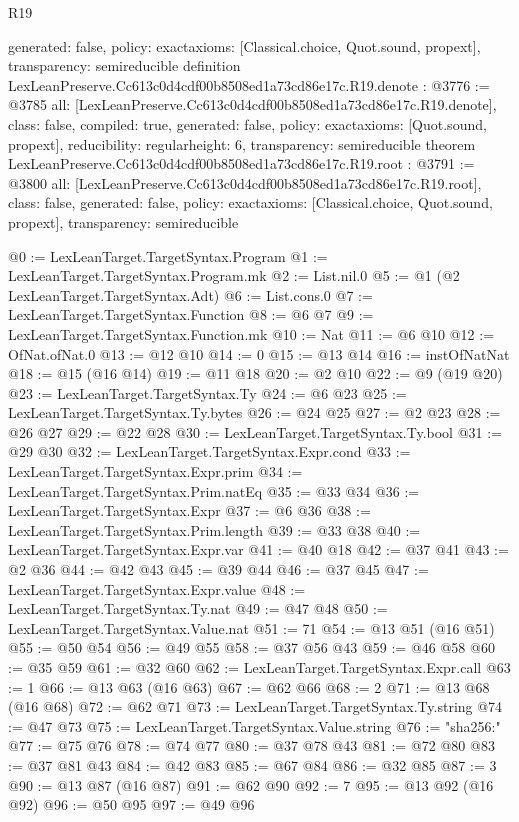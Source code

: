 \begin{lexlean}{R19}
\begin{coremodule}
{  generated: false,
  policy: exact{axioms: [Classical.choice, Quot.sound, propext]},
  transparency: semireducible
}
definition LexLeanPreserve.Cc613c0d4cdf00b8508ed1a73cd86e17c.R19.denote : @3776 := @3785 {
  all: [LexLeanPreserve.Cc613c0d4cdf00b8508ed1a73cd86e17c.R19.denote],
  class: false,
  compiled: true,
  generated: false,
  policy: exact{axioms: [Quot.sound, propext]},
  reducibility: regular{height: 6},
  transparency: semireducible
}
theorem LexLeanPreserve.Cc613c0d4cdf00b8508ed1a73cd86e17c.R19.root : @3791 := @3800 {
  all: [LexLeanPreserve.Cc613c0d4cdf00b8508ed1a73cd86e17c.R19.root],
  class: false,
  generated: false,
  policy: exact{axioms: [Classical.choice, Quot.sound, propext]},
  transparency: semireducible
}

@0 := LexLeanTarget.TargetSyntax.Program
@1 := LexLeanTarget.TargetSyntax.Program.mk
@2 := List.nil.{0}
@5 := @1 (@2 LexLeanTarget.TargetSyntax.Adt)
@6 := List.cons.{0}
@7 := LexLeanTarget.TargetSyntax.Function
@8 := @6 @7
@9 := LexLeanTarget.TargetSyntax.Function.mk
@10 := Nat
@11 := @6 @10
@12 := OfNat.ofNat.{0}
@13 := @12 @10
@14 := 0
@15 := @13 @14
@16 := instOfNatNat
@18 := @15 (@16 @14)
@19 := @11 @18
@20 := @2 @10
@22 := @9 (@19 @20)
@23 := LexLeanTarget.TargetSyntax.Ty
@24 := @6 @23
@25 := LexLeanTarget.TargetSyntax.Ty.bytes
@26 := @24 @25
@27 := @2 @23
@28 := @26 @27
@29 := @22 @28
@30 := LexLeanTarget.TargetSyntax.Ty.bool
@31 := @29 @30
@32 := LexLeanTarget.TargetSyntax.Expr.cond
@33 := LexLeanTarget.TargetSyntax.Expr.prim
@34 := LexLeanTarget.TargetSyntax.Prim.natEq
@35 := @33 @34
@36 := LexLeanTarget.TargetSyntax.Expr
@37 := @6 @36
@38 := LexLeanTarget.TargetSyntax.Prim.length
@39 := @33 @38
@40 := LexLeanTarget.TargetSyntax.Expr.var
@41 := @40 @18
@42 := @37 @41
@43 := @2 @36
@44 := @42 @43
@45 := @39 @44
@46 := @37 @45
@47 := LexLeanTarget.TargetSyntax.Expr.value
@48 := LexLeanTarget.TargetSyntax.Ty.nat
@49 := @47 @48
@50 := LexLeanTarget.TargetSyntax.Value.nat
@51 := 71
@54 := @13 @51 (@16 @51)
@55 := @50 @54
@56 := @49 @55
@58 := @37 @56 @43
@59 := @46 @58
@60 := @35 @59
@61 := @32 @60
@62 := LexLeanTarget.TargetSyntax.Expr.call
@63 := 1
@66 := @13 @63 (@16 @63)
@67 := @62 @66
@68 := 2
@71 := @13 @68 (@16 @68)
@72 := @62 @71
@73 := LexLeanTarget.TargetSyntax.Ty.string
@74 := @47 @73
@75 := LexLeanTarget.TargetSyntax.Value.string
@76 := "sha256:"
@77 := @75 @76
@78 := @74 @77
@80 := @37 @78 @43
@81 := @72 @80
@83 := @37 @81 @43
@84 := @42 @83
@85 := @67 @84
@86 := @32 @85
@87 := 3
@90 := @13 @87 (@16 @87)
@91 := @62 @90
@92 := 7
@95 := @13 @92 (@16 @92)
@96 := @50 @95
@97 := @49 @96

\end{coremodule}
\end{lexlean}
